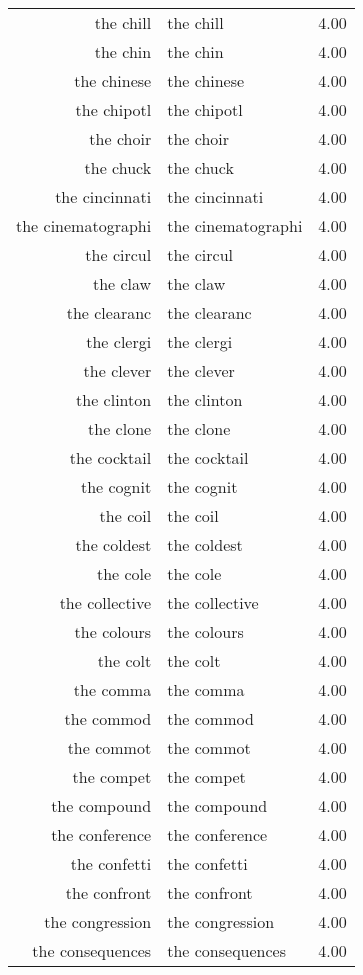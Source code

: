 \begin{table}[ht]
\begin{tabular}{rlr}
  the chill & the chill & 4.00 \\ 
  the chin & the chin & 4.00 \\ 
  the chinese & the chinese & 4.00 \\ 
  the chipotl & the chipotl & 4.00 \\ 
  the choir & the choir & 4.00 \\ 
  the chuck & the chuck & 4.00 \\ 
  the cincinnati & the cincinnati & 4.00 \\ 
  the cinematographi & the cinematographi & 4.00 \\ 
  the circul & the circul & 4.00 \\ 
  the claw & the claw & 4.00 \\ 
  the clearanc & the clearanc & 4.00 \\ 
  the clergi & the clergi & 4.00 \\ 
  the clever & the clever & 4.00 \\ 
  the clinton & the clinton & 4.00 \\ 
  the clone & the clone & 4.00 \\ 
  the cocktail & the cocktail & 4.00 \\ 
  the cognit & the cognit & 4.00 \\ 
  the coil & the coil & 4.00 \\ 
  the coldest & the coldest & 4.00 \\ 
  the cole & the cole & 4.00 \\ 
  the collective & the collective & 4.00 \\ 
  the colours & the colours & 4.00 \\ 
  the colt & the colt & 4.00 \\ 
  the comma & the comma & 4.00 \\ 
  the commod & the commod & 4.00 \\ 
  the commot & the commot & 4.00 \\ 
  the compet & the compet & 4.00 \\ 
  the compound & the compound & 4.00 \\ 
  the conference & the conference & 4.00 \\ 
  the confetti & the confetti & 4.00 \\ 
  the confront & the confront & 4.00 \\ 
  the congression & the congression & 4.00 \\ 
  the consequences & the consequences & 4.00 \\ 

\end{tabular}
\end{table}
